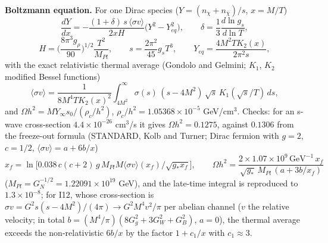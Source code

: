 \documentclass[
  10pt,
]{article}
\begin{document}
\textbf{Boltzmann equation.} For one Dirac species
(\(Y = (n_\chi + n_{\bar\chi})/s\), \(x = M/T\))
\[ \frac{dY}{dx} = -\frac{(1 + \delta)\,s\,\langle\sigma v\rangle}{2xH}\big(Y^2 - Y_{eq}^2\big),\qquad \delta = \frac13\frac{d\ln g_s}{d\ln T},\]
\[ H = \Big(\frac{8\pi^3g_\rho}{90}\Big)^{1/2}\frac{T^2}{M_{Pl}},\qquad s = \frac{2\pi^2}{45}g_sT^3,\qquad Y_{eq} = \frac{4M^2TK_2(x)}{2\pi^2s}, \]
with the exact relativistic thermal average (Gondolo and Gelmini;
\(K_1\), \(K_2\) modified Bessel functions)
\[ \langle\sigma v\rangle = \frac{1}{8M^4TK_2(x)^2}\int_{4M^2}^{\infty}\sigma(s)\,(s - 4M^2)\,\sqrt s\,K_1(\sqrt s/T)\,ds, \]
and \(\Omega h^2 = MY_\infty s_0/(\rho_c/h^2)\),
\(\rho_c/h^2 = 1.05368\times10^{-5}\) GeV/cm\(^3\). Checks: for an
s-wave cross-section \(4.4\times10^{-26}\) cm\(^3\)/s it gives
\(\Omega h^2 = 0.1275\), against \(0.1306\) from the freeze-out formula
(STANDARD, Kolb and Turner; Dirac fermion with \(g = 2\), \(c = 1/2\),
\(\langle\sigma v\rangle = a + 6b/x\))
\[ x_f = \ln\Big[0.038\,c(c+2)\,g\,M_{Pl}M\langle\sigma v\rangle(x_f)\big/\sqrt{g_*x_f}\Big],\qquad
   \Omega h^2 = \frac{2\times1.07\times10^9\,\text{GeV}^{-1}\,x_f}{\sqrt{g_*}\,M_{Pl}\,(a + 3b/x_f)} \]
(\(M_{Pl} = G_N^{-1/2} = 1.22091\times10^{19}\) GeV), and the late-time
integral is reproduced to \(1.3\times10^{-8}\); for I12, whose
cross-section is \(\sigma v = G^2s(s - 4M^2)/(4\pi) \to G^2M^4v^2/\pi\)
per abelian channel (\(v\) the relative velocity; in total
\(b = (M^4/\pi)(8G_g^2 + 3G_W^2 + G_B^2)\), \(a = 0\)), the thermal
average exceeds the non-relativistic \(6b/x\) by the factor
\(1 + c_1/x\) with \(c_1 \approx 3\).
\end{document}
